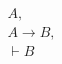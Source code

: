 \documentclass[preview]{standalone}
\begin{document}
\begin{align*}
A,\\ A\rightarrow B,\\\vdash B
\end{align*}
\end{document}
